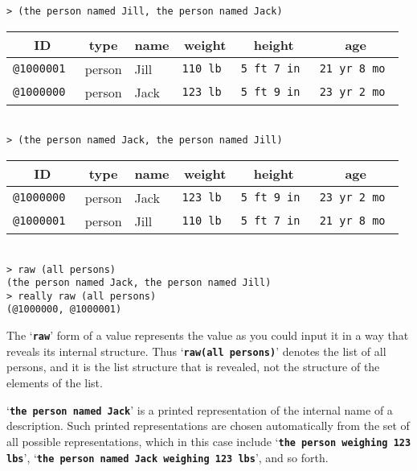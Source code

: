 \documentclass[12pt]{article}
\newcommand{\TT}[1]{{\tt \bfseries #1}}
\newenvironment{indpar}[1][0.3in]%
	{\begin{list}{}%
		     {\setlength{\itemsep}{0in}%
		      \setlength{\topsep}{0in}%
		      \setlength{\parsep}{1ex}%
		      \setlength{\labelwidth}{#1}%
		      \setlength{\leftmargin}{#1}%
		      \addtolength{\leftmargin}{\labelsep}}%
	 \item}%
	{\end{list}}
\begin{document}
\begin{indpar}
\verb|> (the person named Jill, the person named Jack)| \\
\begin{tabular}{|r|l|l|r|r|r|}
\hline
\multicolumn{1}{|c}{\bf ID} &
\multicolumn{1}{|c}{\bf type} &
\multicolumn{1}{|c}{\bf name} &
\multicolumn{1}{|c}{\bf weight} &
\multicolumn{1}{|c}{\bf height} &
\multicolumn{1}{|c|}{\bf age} \\
\hline
\tt @1000001 & person & Jill & \tt 110 lb & \tt 5 ft 7 in & \tt 21 yr 8 mo \\
\tt @1000000 & person & Jack & \tt 123 lb & \tt 5 ft 9 in & \tt 23 yr 2 mo \\
\hline
\end{tabular} \\[0.5ex]
\verb|> (the person named Jack, the person named Jill)| \\
\begin{tabular}{|r|l|l|r|r|r|}
\hline
\multicolumn{1}{|c}{\bf ID} &
\multicolumn{1}{|c}{\bf type} &
\multicolumn{1}{|c}{\bf name} &
\multicolumn{1}{|c}{\bf weight} &
\multicolumn{1}{|c}{\bf height} &
\multicolumn{1}{|c|}{\bf age} \\
\hline
\tt @1000000 & person & Jack & \tt 123 lb & \tt 5 ft 9 in & \tt 23 yr 2 mo \\
\tt @1000001 & person & Jill & \tt 110 lb & \tt 5 ft 7 in & \tt 21 yr 8 mo \\
\hline
\end{tabular} \\[0.5ex]
\verb|> raw (all persons)| \\
\verb|(the person named Jack, the person named Jill)| \\
\verb|> really raw (all persons)| \\
\verb|(@1000000, @1000001)|
\end{indpar}

The `\TT{raw}' form of a value represents the value
as you could input it in a way that reveals its internal structure.  Thus
`\TT{raw(all~persons)}' denotes the list of all persons, and it is the list
structure that is revealed, not the structure of the elements of the list.

`\TT{the person named Jack}' is a printed representation of the
internal name of a description.  Such printed representations are chosen
automatically from the set of all possible representations, which
in this case include `\TT{the person weighing 123 lbs}',
`\TT{the person named Jack weighing 123 lbs}', and so forth.
\end{document}
